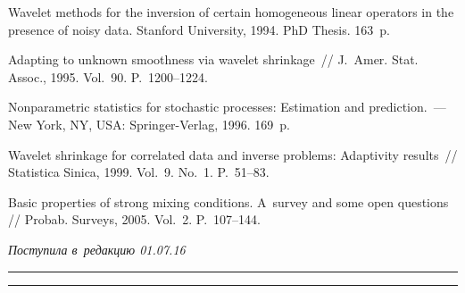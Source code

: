 \begin{multicols}{2}
{{\begin{thebibliography}{99}
 Wavelet methods for the inversion of certain homogeneous 
linear operators in the presence of noisy data.  Stanford University, 1994.  
PhD Thesis. 163~p.

 Adapting to unknown smoothness via wavelet shrinkage~// 
J.~Amer. Stat. Assoc., 1995. Vol.~90. P.~1200--1224.

 Nonparametric statistics for stochastic processes: Estimation 
and prediction.~--- New York, NY, USA: Springer-Verlag, 1996. 169~p.

 Wavelet shrinkage for correlated data and inverse problems:
Adaptivity results~// Statistica Sinica, 1999. Vol.~9. No.~1. P.~51--83.

 Basic properties of strong mixing conditions. 
A~survey and some open questions // Probab. Surveys, 2005. Vol.~2. P.~107--144.

\end{thebibliography}

 }
 }

\end{multicols}

\vspace*{-6pt}

\hfill{\small\textit{Поступила в~редакцию 01.07.16}}

\vspace*{6pt}



\hrule

\vspace*{2pt}

\hrule

\vspace*{6pt}



\def\tit{THE STRONG LAW OF~LARGE NUMBERS FOR~THE~RISK ESTIMATE IN~THE~PROBLEM 
OF~TOMOGRAPHIC IMAGE RECONSTRUCTION FROM~PROJECTIONS WITH~A~CORRELATED NOISE}

\def\titkol{The strong law of large numbers for the risk estimate in~the~problem 
of~tomographic image reconstruction} %

\def\aut{O.\,V.~Shestakov$^{1,2}$}

\def\autkol{O.\,V.~Shestakov}

